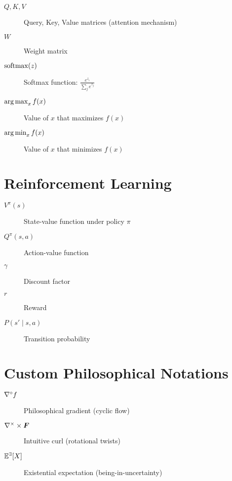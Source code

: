 \begin{description}
    \item[$Q, K, V$] Query, Key, Value matrices (attention mechanism)
    \item[$W$] Weight matrix
    \item[$\operatorname{softmax}(z)$] Softmax function: $\frac{e^{z_i}}{\sum_j e^{z_j}}$
    \item[$\operatorname*{arg\,max}_x f(x)$] Value of $x$ that maximizes $f(x)$
    \item[$\operatorname*{arg\,min}_x f(x)$] Value of $x$ that minimizes $f(x)$
\end{description}

\section*{Reinforcement Learning}

\begin{description}
    \item[$V^\pi(s)$] State-value function under policy $\pi$
    \item[$Q^\pi(s,a)$] Action-value function
    \item[$\gamma$] Discount factor
    \item[$r$] Reward
    \item[$P(s' \mid s, a)$] Transition probability
\end{description}

\section*{Custom Philosophical Notations}

\begin{description}
    \item[$\nabla^{\circ} f$] Philosophical gradient (cyclic flow)
    \item[$\nabla^{\times} \times \bm{F}$] Intuitive curl (rotational twists)
    \item[\ensuremath{\existE[X]}] Existential expectation (being-in-uncertainty)
\end{description}
